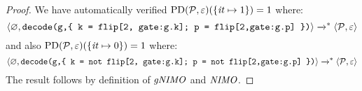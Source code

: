 \begin{proof}
  We have automatically verified $
  \mathrm{PD}(\mathcal{P},\varepsilon)(\{ \mathit{it} \mapsto 1 \}) = 1$ where:
  $$\langle \varnothing,\texttt{decode(g,\{ k = flip[2, gate:g.k]; p = flip[2,gate:g.p] \})} \rangle
    \xrightarrow{}^{*} \langle \mathcal{P},\varepsilon \rangle$$
    and also $
  \mathrm{PD}(\mathcal{P},\varepsilon)(\{ \mathit{it} \mapsto 0 \}) = 1$ where:
  $$\langle \varnothing,\texttt{decode(g,\{ k = not flip[2, gate:g.k]; p = not flip[2,gate:g.p] \})} \rangle
    \xrightarrow{}^{*} \langle \mathcal{P},\varepsilon \rangle$$
  The result follows by definition of $\mathit{gNIMO}$ and $\mathit{NIMO}$.
\end{proof}
